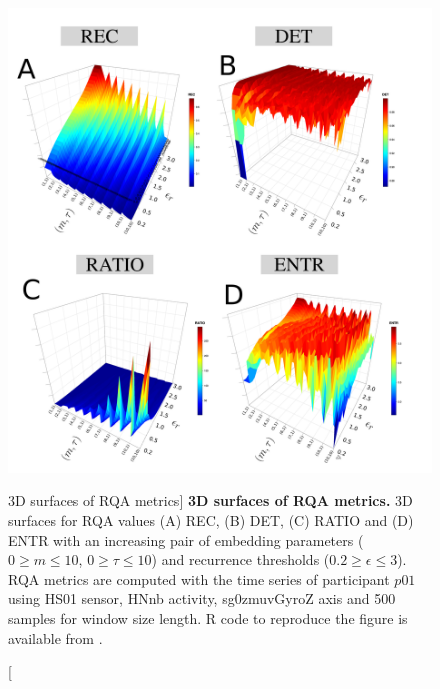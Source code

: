 \begin{figure}[h!]
\centering
\includegraphics[width=1.0\textwidth]{rqas_w500}
    \caption
	[3D surfaces of RQA metrics]{
	{\bf 3D surfaces of RQA metrics.}
	3D surfaces for RQA values (A) REC, (B) DET, (C) RATIO and 
	(D) ENTR with an increasing pair of embedding parameters 
	($0 \ge m \le 10$, $0 \ge \tau \le 10$) 
	and recurrence thresholds ($ 0.2 \ge \epsilon \le 3 $).
	RQA metrics are computed with the time series of participant $p01$ using 
	HS01 sensor, HNnb activity, sg0zmuvGyroZ axis and 500 samples 
	for window size length.
        R code to reproduce the figure is available from \cite{hwum2018}.
	}
\label{fig:topo_rqas_w500}
\end{figure}


\newpage
